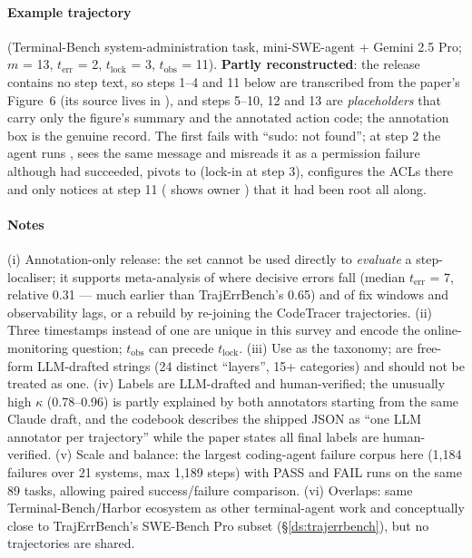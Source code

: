 \paragraph{Example trajectory}  (Terminal-Bench system-administration task, mini-SWE-agent + Gemini 2.5 Pro; $m$ = 13, $t_{\mathrm{err}}$ = 2, $t_{\mathrm{lock}}$ = 3, $t_{\mathrm{obs}}$ = 11). \textbf{Partly reconstructed}: the release contains no step text, so steps 1--4 and 11 below are transcribed from the paper's Figure~6 (its source lives in ), and steps 5--10, 12 and 13 are \emph{placeholders} that carry only the figure's summary and the annotated action code; the annotation box is the genuine record. The first  fails with ``sudo: not found''; at step 2 the agent runs , sees the same message and misreads it as a permission failure although  had succeeded, pivots to  (lock-in at step 3), configures the ACLs there and only notices at step 11 ( shows owner ) that it had been root all along.


\paragraph{Notes} (i) Annotation-only release: the set cannot be used directly to \emph{evaluate} a step-localiser; it supports meta-analysis of where decisive errors fall (median $t_{\mathrm{err}}$ = 7, relative 0.31 --- much earlier than TrajErrBench's 0.65) and of fix windows and observability lags, or a rebuild by re-joining the CodeTracer trajectories. (ii) Three timestamps instead of one are unique in this survey and encode the online-monitoring question; $t_{\mathrm{obs}}$ can precede $t_{\mathrm{lock}}$. (iii) Use  as the taxonomy;  are free-form LLM-drafted strings (24 distinct ``layers'', 15+ categories) and should not be treated as one. (iv) Labels are LLM-drafted and human-verified; the unusually high $\kappa$ (0.78--0.96) is partly explained by both annotators starting from the same Claude draft, and the codebook describes the shipped JSON as ``one LLM annotator per trajectory'' while the paper states all final labels are human-verified. (v) Scale and balance: the largest coding-agent failure corpus here (1,184 failures over 21 systems, max 1,189 steps) with PASS and FAIL runs on the same 89 tasks, allowing paired success/failure comparison. (vi) Overlaps: same Terminal-Bench/Harbor ecosystem as other terminal-agent work and conceptually close to TrajErrBench's SWE-Bench Pro subset (\S\ref{ds:trajerrbench}), but no trajectories are shared.
